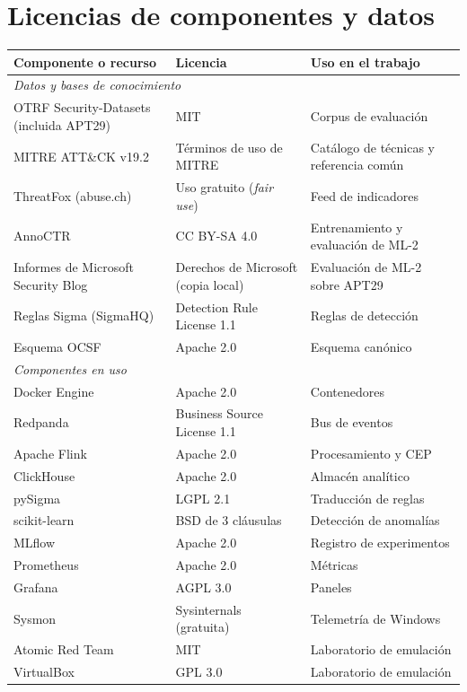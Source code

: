 \chapter{Licencias de componentes y datos}
\label{anx:licencias}

\begin{table}[H]
\centering
\footnotesize
\begin{tabularx}{\textwidth}{|l|l|X|}
\hline
\textbf{Componente o recurso} & \textbf{Licencia} & \textbf{Uso en el trabajo} \\
\hline
\multicolumn{3}{|l|}{\textit{Datos y bases de conocimiento}} \\
\hline
OTRF Security-Datasets (incluida APT29) & MIT & Corpus de evaluación \\
MITRE ATT\&CK v19.2 & Términos de uso de MITRE & Catálogo de técnicas y referencia común \\
ThreatFox (abuse.ch) & Uso gratuito (\textit{fair use}) & Feed de indicadores \\
AnnoCTR & CC BY-SA 4.0 & Entrenamiento y evaluación de ML-2 \\
Informes de Microsoft Security Blog & Derechos de Microsoft (copia local) & Evaluación de ML-2 sobre APT29 \\
Reglas Sigma (SigmaHQ) & Detection Rule License 1.1 & Reglas de detección \\
Esquema OCSF & Apache 2.0 & Esquema canónico \\
\hline
\multicolumn{3}{|l|}{\textit{Componentes en uso}} \\
\hline
Docker Engine & Apache 2.0 & Contenedores \\
Redpanda & Business Source License 1.1 & Bus de eventos \\
Apache Flink & Apache 2.0 & Procesamiento y CEP \\
ClickHouse & Apache 2.0 & Almacén analítico \\
pySigma & LGPL 2.1 & Traducción de reglas \\
scikit-learn & BSD de 3 cláusulas & Detección de anomalías \\
MLflow & Apache 2.0 & Registro de experimentos \\
Prometheus & Apache 2.0 & Métricas \\
Grafana & AGPL 3.0 & Paneles \\
Sysmon & Sysinternals (gratuita) & Telemetría de Windows \\
Atomic Red Team & MIT & Laboratorio de emulación \\
VirtualBox & GPL 3.0 & Laboratorio de emulación \\

\end{tabularx}
\end{table}

